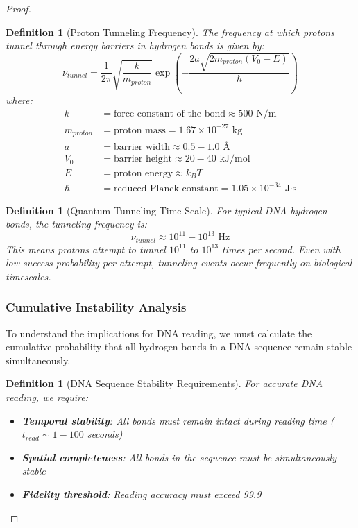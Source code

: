 \documentclass[12pt,a4paper]{article}
\newtheorem{definition}[theorem]{Definition}
\begin{document}
\begin{proof}
\begin{definition}[Proton Tunneling Frequency]
The frequency at which protons tunnel through energy barriers in hydrogen bonds is given by:
\begin{equation}
\nu_{tunnel} = \frac{1}{2\pi} \sqrt{\frac{k}{m_{proton}}} \exp\left(-\frac{2a\sqrt{2m_{proton}(V_0-E)}}{\hbar}\right)
\end{equation}
where:
\begin{align}
k &= \text{force constant of the bond} \approx 500 \text{ N/m} \\
m_{proton} &= \text{proton mass} = 1.67 \times 10^{-27} \text{ kg} \\
a &= \text{barrier width} \approx 0.5-1.0 \text{ Å} \\
V_0 &= \text{barrier height} \approx 20-40 \text{ kJ/mol} \\
E &= \text{proton energy} \approx k_BT \\
\hbar &= \text{reduced Planck constant} = 1.05 \times 10^{-34} \text{ J·s}
\end{align}
\end{definition}

\begin{definition}[Quantum Tunneling Time Scale]
For typical DNA hydrogen bonds, the tunneling frequency is:
\begin{equation}
\nu_{tunnel} \approx 10^{11} - 10^{13} \text{ Hz}
\end{equation}
This means protons attempt to tunnel $10^{11}$ to $10^{13}$ times per second. Even with low success probability per attempt, tunneling events occur frequently on biological timescales.
\end{definition}

\subsubsection{Cumulative Instability Analysis}

To understand the implications for DNA reading, we must calculate the cumulative probability that all hydrogen bonds in a DNA sequence remain stable simultaneously.

\begin{definition}[DNA Sequence Stability Requirements]
For accurate DNA reading, we require:
\begin{itemize}
\item \textbf{Temporal stability}: All bonds must remain intact during reading time ($t_{read} \sim 1-100$ seconds)
\item \textbf{Spatial completeness}: All bonds in the sequence must be simultaneously stable
\item \textbf{Fidelity threshold}: Reading accuracy must exceed 99.9%
\end{itemize}
\end{definition}


\end{proof}
\end{document}
